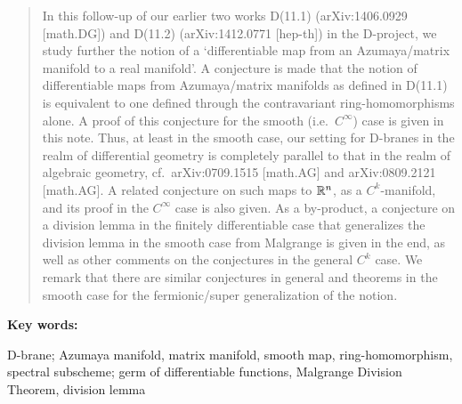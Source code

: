 \documentclass[11pt]{article}
\numberwithin{equation}{subsection}
\begin{document}
\begin{titlepage}
\begin{quotation}
\baselineskip 12pt  %
{\small
 In this follow-up of our earlier two works
    D(11.1) (arXiv:1406.0929 [math.DG])  and
    D(11.2) (arXiv:1412.0771 [hep-th])
      in the D-project,
 we study further
   the notion of a `differentiable map from an Azumaya/matrix manifold to a real manifold'.
 A conjecture is made
  that  the notion of differentiable maps from Azumaya/matrix manifolds
    as defined in D(11.1)
    is equivalent to one defined through the contravariant ring-homomorphisms alone.
 A proof  of this conjecture for the smooth (i.e.\ $C^{\infty}$) case is given in this note.
 Thus, at least in the smooth case,
  our setting for D-branes in the realm of differential geometry
  is completely parallel to that in the realm of algebraic geometry,
  cf.\ arXiv:0709.1515 [math.AG] and arXiv:0809.2121 [math.AG].
 A related conjecture on such maps to ${\Bbb R}^n$, as a $C^k$-manifold,
  and its proof in the $C^{\infty}$ case is also given.
 As a by-product, a conjecture on a division lemma in the finitely differentiable case
  that generalizes the division lemma in the smooth case from Malgrange
  is given in the end, as well as other comments on the conjectures in the general $C^k$ case.
 We remark that there are similar conjectures in general and theorems in the smooth case
   for the fermionic/super generalization of the notion.
} %
\end{quotation}



\vspace{9.6em}

\baselineskip 12pt
{\footnotesize
\noindent
{\bf Key words:} \parbox[t]{14cm}{D-brane;
 Azumaya manifold, matrix manifold, smooth map, ring-homomorphism, spectral subscheme;
 germ of differentiable functions, Malgrange Division Theorem, division lemma
 }} %

 \bigskip


\bigskip



\end{titlepage}
\end{document}
